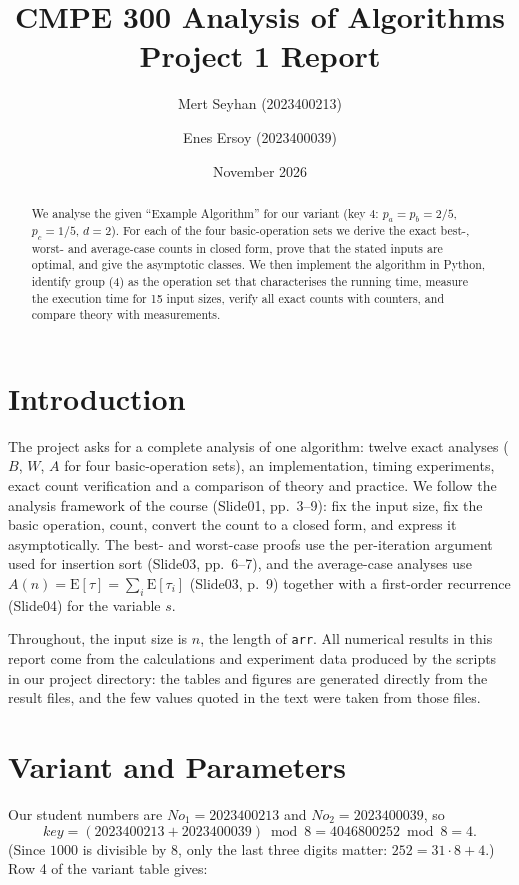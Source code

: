 \documentclass[11pt]{article}
\title{CMPE 300 Analysis of Algorithms\\[0.3em] \large Project 1 Report}
\author{Mert Seyhan (2023400213) \and Enes Ersoy (2023400039)}
\date{November 2026}
\theoremstyle{remark}
\newcommand{\E}{\mathrm{E}}
\begin{document}
\maketitle

\begin{abstract}
We analyse the given ``Example Algorithm'' for our variant (key $4$: $p_a=p_b=2/5$, $p_c=1/5$, $d=2$).
For each of the four basic-operation sets we derive the exact best-, worst- and average-case counts in closed form,
prove that the stated inputs are optimal, and give the asymptotic classes. We then implement the algorithm in Python,
identify group (4) as the operation set that characterises the running time, measure the execution time for 15 input
sizes, verify all exact counts with counters, and compare theory with measurements.
\end{abstract}

\tableofcontents
\newpage

\section{Introduction}
The project asks for a complete analysis of one algorithm: twelve exact analyses ($B$, $W$, $A$ for four
basic-operation sets), an implementation, timing experiments, exact count verification and a comparison of theory and
practice. We follow the analysis framework of the course (Slide01, pp.~3--9): fix the input size, fix the basic
operation, count, convert the count to a closed form, and express it asymptotically. The best- and worst-case proofs
use the per-iteration argument used for insertion sort (Slide03, pp.~6--7), and the average-case analyses use
$A(n)=\E[\tau]=\sum_i \E[\tau_i]$ (Slide03, p.~9) together with a first-order recurrence (Slide04) for the variable $s$.

Throughout, the input size is $n$, the length of \texttt{arr}. All numerical results in this report come from the calculations and
experiment data produced by the scripts in our project directory: the tables and figures are generated directly from
the result files, and the few values quoted in the text were taken from those files.

\section{Variant and Parameters}
Our student numbers are $No_1 = 2023400213$ and $No_2 = 2023400039$, so
\[
key = (2023400213 + 2023400039) \bmod 8 = 4046800252 \bmod 8 = 4 .
\]
(Since $1000$ is divisible by $8$, only the last three digits matter: $252 = 31\cdot 8 + 4$.) Row 4 of the variant
table gives:
\end{document}
